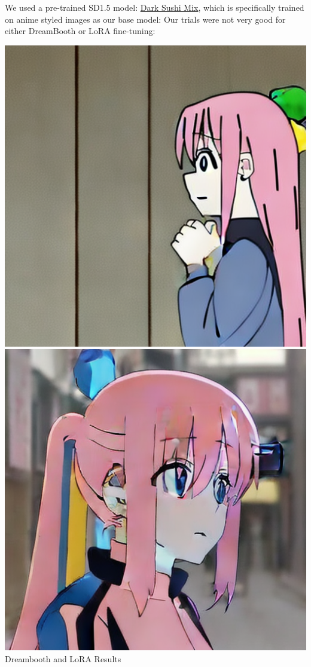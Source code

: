 \documentclass{article}
\begin{document}
We used a pre-trained SD1.5 model: \href{https://civitai.com/models/24779?modelVersionId=93208}{Dark Sushi Mix}, which is specifically trained on anime styled images as our base model: Our trials were not very good for either DreamBooth or LoRA fine-tuning:
\begin{center}
    \includegraphics[scale=0.2]{.imgs/bocchi_(1)_5220.png}
    \includegraphics[scale=0.2]{.imgs/bocchi_lora_(2)_2160.png} \\
    Dreambooth and LoRA Results
\end{center}
\end{document}
